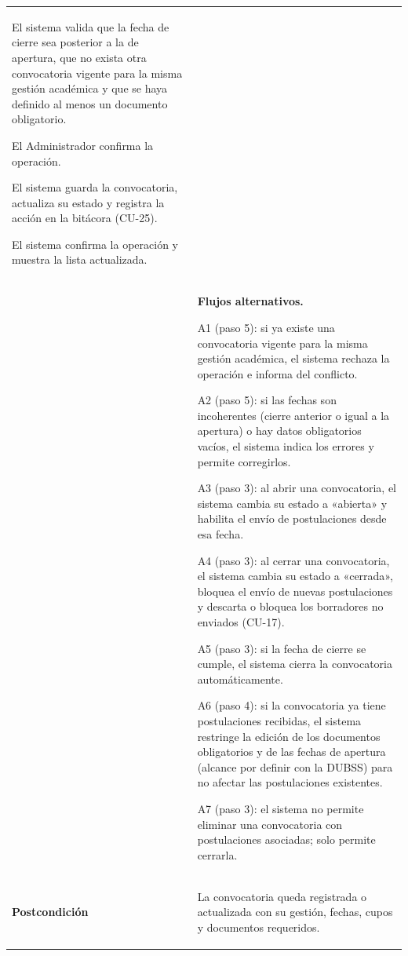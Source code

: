 \begin{longtable}{>{\raggedright\arraybackslash}p{2.9cm} >{\raggedright\arraybackslash}p{12.6cm}}
\begin{cupasos}
    \item El sistema valida que la fecha de cierre sea posterior a la de apertura, que no exista otra convocatoria vigente para la misma gestión académica y que se haya definido al menos un documento obligatorio.
    \item El Administrador confirma la operación.
    \item El sistema guarda la convocatoria, actualiza su estado y registra la acción en la bitácora (CU-25).
    \item El sistema confirma la operación y muestra la lista actualizada.
\end{cupasos} \\
 & \textbf{Flujos alternativos.}
\begin{cuvin}
    \item A1 (paso 5): si ya existe una convocatoria vigente para la misma gestión académica, el sistema rechaza la operación e informa del conflicto.
    \item A2 (paso 5): si las fechas son incoherentes (cierre anterior o igual a la apertura) o hay datos obligatorios vacíos, el sistema indica los errores y permite corregirlos.
    \item A3 (paso 3): al abrir una convocatoria, el sistema cambia su estado a «abierta» y habilita el envío de postulaciones desde esa fecha.
    \item A4 (paso 3): al cerrar una convocatoria, el sistema cambia su estado a «cerrada», bloquea el envío de nuevas postulaciones y descarta o bloquea los borradores no enviados (CU-17).
    \item A5 (paso 3): si la fecha de cierre se cumple, el sistema cierra la convocatoria automáticamente.
    \item A6 (paso 4): si la convocatoria ya tiene postulaciones recibidas, el sistema restringe la edición de los documentos obligatorios y de las fechas de apertura (alcance por definir con la DUBSS) para no afectar las postulaciones existentes.
    \item A7 (paso 3): el sistema no permite eliminar una convocatoria con postulaciones asociadas; solo permite cerrarla.
\end{cuvin} \\
\midrule
\textbf{Postcondición} & \vspace{-\baselineskip}\begin{cuvin}
    \item La convocatoria queda registrada o actualizada con su gestión, fechas, cupos y documentos requeridos.

\end{cuvin}
\end{longtable}
